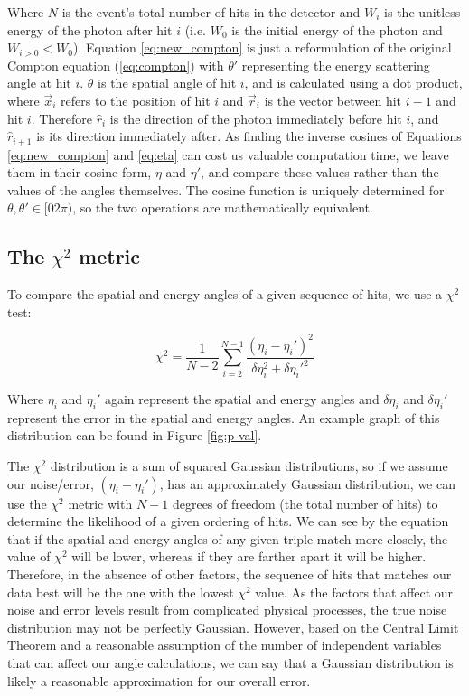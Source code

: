 Where $N$ is the event's total number of hits in the detector and $W_i$ is the unitless energy of the photon after hit $i$ (i.e. $W_0$ is the initial energy of the photon and $W_{i>0} < W_0$). Equation \ref{eq:new_compton} is just a reformulation of the original Compton equation (\ref{eq:compton}) with $\theta'$ representing the energy scattering angle at hit $i$. $\theta$ is the spatial angle of hit $i$, and is calculated using a dot product, where $\vec{x}_i$ refers to the position of hit $i$ and $\vec{r}_i$ is the vector between hit $i-1$ and hit $i$. Therefore $\hat{r}_i$ is the direction of the photon immediately before hit $i$, and $\hat{r}_{i+1}$ is its direction immediately after. As finding the inverse cosines of Equations \ref{eq:new_compton} and \ref{eq:eta} can cost us valuable computation time, we leave them in their cosine form, $\eta$ and $\eta'$, and compare these values rather than the values of the angles themselves. The cosine function is uniquely determined for $\theta, \theta' \in [0 2\pi)$, so the two operations are mathematically equivalent.

\subsection*{The $\chi^2$ metric}
To compare the spatial and energy angles of a given sequence of hits, we use a $\chi^2$ test:

\begin{equation}
    \label{eq:chi2}\chi^2 = \frac{1}{N-2} \sum_{i=2}^{N-1} \frac{(\eta_i-\eta_i')^2}{\delta\eta_i^2+\delta\eta_i'^2}
\end{equation}

Where $\eta_i$ and $\eta_i'$ again represent the spatial and energy angles and $\delta\eta_i$ and $\delta\eta_i'$ represent the error in the spatial and energy angles. An example graph of this distribution can be found in Figure \ref{fig:p-val}.

The $\chi^2$ distribution is a sum of squared Gaussian distributions, so if we assume our noise/error, $(\eta_i-\eta_i')$, has an approximately Gaussian distribution, we can use the $\chi^2$ metric with $N-1$ degrees of freedom (the total number of hits) to determine the likelihood of a given ordering of hits. We can see by the equation that if the spatial and energy angles of any given triple match more closely, the value of $\chi^2$ will be lower, whereas if they are farther apart it will be higher. Therefore, in the absence of other factors, the sequence of hits that matches our data best will be the one with the lowest $\chi^2$ value. As the factors that affect our noise and error levels result from complicated physical processes, the true noise distribution may not be perfectly Gaussian. However, based on the Central Limit Theorem\cite{CLT} and a reasonable assumption of the number of independent variables that can affect our angle calculations, we can say that a Gaussian distribution is likely a reasonable approximation for our overall error.

